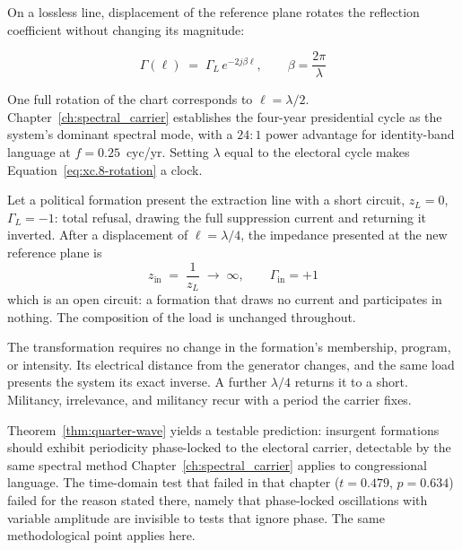 On a lossless line, displacement of the reference plane rotates the reflection coefficient without
changing its magnitude:

\begin{equation}\label{eq:xc.8-rotation}
\Gamma(\ell) \;=\; \Gamma_L\, e^{-2j\beta \ell}, \qquad \beta = \frac{2\pi}{\lambda}
\end{equation}

One full rotation of the chart corresponds to $\ell = \lambda/2$. Chapter~\ref{ch:spectral_carrier}
establishes the four-year presidential cycle as the system's dominant spectral mode, with a
$24{:}1$ power advantage for identity-band language at $f = 0.25$~cyc/yr. Setting $\lambda$ equal to
the electoral cycle makes Equation~\ref{eq:xc.8-rotation} a clock.

\begin{theorem}
\label{thm:quarter-wave}
Let a political formation present the extraction line with a short circuit, $z_L = 0$,
$\Gamma_L = -1$: total refusal, drawing the full suppression current and returning it inverted.
After a displacement of $\ell = \lambda/4$, the impedance presented at the new reference plane is
\begin{equation}\label{eq:xc.9-quarter-wave-transform}
z_{\text{in}} \;=\; \frac{1}{z_L} \;\longrightarrow\; \infty, \qquad \Gamma_{\text{in}} = +1
\end{equation}
which is an open circuit: a formation that draws no current and participates in nothing. The
composition of the load is unchanged throughout.
\end{theorem}

The transformation requires no change in the formation's membership, program, or intensity. Its
electrical distance from the generator changes, and the same load presents the system its exact
inverse. A further $\lambda/4$ returns it to a short. Militancy, irrelevance, and militancy recur
with a period the carrier fixes.

Theorem~\ref{thm:quarter-wave} yields a testable prediction: insurgent formations should exhibit
periodicity phase-locked to the electoral carrier, detectable by the same spectral method
Chapter~\ref{ch:spectral_carrier} applies to congressional language. The time-domain test that
failed in that chapter ($t = 0.479$, $p = 0.634$) failed for the reason stated there, namely that
phase-locked oscillations with variable amplitude are invisible to tests that ignore phase. The same
methodological point applies here.

